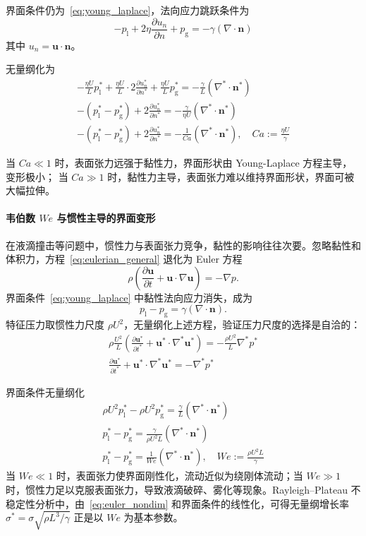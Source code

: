 界面条件仍为~\eqref{eq:young_laplace}，法向应力跳跃条件为
\[
-p_{\text{l}} + 2\eta \frac{\partial u_n}{\partial n} + p_{\text{g}} = -\gamma (\nabla \cdot \mathbf{n})
\]
其中 $u_n = \mathbf{u} \cdot \mathbf{n}$。

无量纲化为
\begin{gather*}
    -\frac{\eta U}{L} p_{\text{l}}^* + \frac{\eta U}{L} \cdot 2\frac{\partial u_n^*}{\partial n^*} + \frac{\eta U}{L} p_{\text{g}}^*
    = -\frac{\gamma}{L} (\nabla^* \cdot \mathbf{n}^*)\\
    -(p_{\text{l}}^* - p_{\text{g}}^*) + 2\frac{\partial u_n^*}{\partial n^*} = -\frac{\gamma}{\eta U} (\nabla^* \cdot \mathbf{n}^*)\\
    -(p_{\text{l}}^* - p_{\text{g}}^*) + 2\frac{\partial u_n^*}{\partial n^*} = -\frac{1}{Ca} (\nabla^* \cdot \mathbf{n}^*),\quad
    Ca := \frac{\eta U}{\gamma}
\end{gather*}

当 $Ca \ll 1$ 时，表面张力远强于黏性力，界面形状由 Young-Laplace 方程主导，变形极小；
当 $Ca \gg 1$ 时，黏性力主导，表面张力难以维持界面形状，界面可被大幅拉伸。

\paragraph{韦伯数 $We$ 与惯性主导的界面变形}

在液滴撞击等问题中，惯性力与表面张力竞争，黏性的影响往往次要。忽略黏性和体积力，方程~\eqref{eq:eulerian_general} 退化为 Euler 方程
\begin{equation}
    \rho \left( \frac{\partial \mathbf{u}}{\partial t} + \mathbf{u}\cdot\nabla\mathbf{u} \right) = -\nabla p.
\end{equation}
界面条件~\eqref{eq:young_laplace} 中黏性法向应力消失，成为
\[
p_{\text{l}} - p_{\text{g}} = \gamma (\nabla \cdot \mathbf{n}).
\]
特征压力取惯性力尺度 $\rho U^2$，无量纲化上述方程，验证压力尺度的选择是自洽的：
\begin{gather}
    \rho \frac{U^2}{L}\left(\frac{\partial \mathbf{u}^*}{\partial t^*} + \mathbf{u}^*\cdot\nabla^*\mathbf{u}^*\right) = -\frac{\rho U^2}{L}\nabla^* p^*
\\
    \frac{\partial \mathbf{u}^*}{\partial t^*} + \mathbf{u}^*\cdot\nabla^*\mathbf{u}^* = -\nabla^* p^*
    \label{eq:euler_nondim}
\end{gather}


界面条件无量纲化
\begin{gather*}
    \rho U^2 p_{\text{l}}^* - \rho U^2 p_{\text{g}}^* = \frac{\gamma}{L} (\nabla^* \cdot \mathbf{n}^*)\\
    p_{\text{l}}^* - p_{\text{g}}^* = \frac{\gamma}{\rho U^2 L} (\nabla^* \cdot \mathbf{n}^*)\\
    p_{\text{l}}^* - p_{\text{g}}^* = \frac{1}{We} (\nabla^* \cdot \mathbf{n}^*),\quad
    We := \frac{\rho U^2 L}{\gamma}
\end{gather*}
当 $We \ll 1$ 时，表面张力使界面刚性化，流动近似为绕刚体流动；当 $We \gg 1$ 时，惯性力足以克服表面张力，导致液滴破碎、雾化等现象。Rayleigh--Plateau 不稳定性分析中，由~\eqref{eq:euler_nondim} 和界面条件的线性化，可得无量纲增长率 $\sigma^* = \sigma \sqrt{\rho L^3/\gamma}$ 正是以 $We$ 为基本参数。

